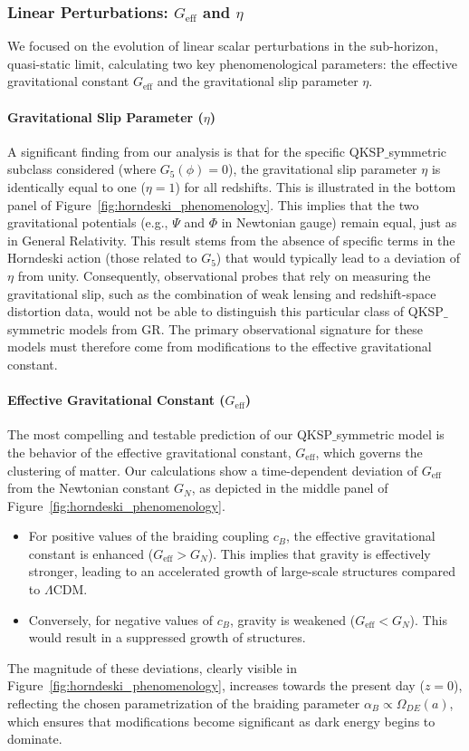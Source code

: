 \documentclass[twocolumn]{aastex631}
\begin{document}
\subsubsection{Linear Perturbations: $G_{\text{eff}}$ and $\eta$}
We focused on the evolution of linear scalar perturbations in the sub-horizon, quasi-static limit, calculating two key phenomenological parameters: the effective gravitational constant $G_{\text{eff}}$ and the gravitational slip parameter $\eta$.

\paragraph{Gravitational Slip Parameter ($\eta$)}
A significant finding from our analysis is that for the specific QKSP\ensuremath{\_}symmetric subclass considered (where $G_5(\phi)=0$), the gravitational slip parameter $\eta$ is identically equal to one ($\eta=1$) for all redshifts. This is illustrated in the bottom panel of \mbox{Figure \ref{fig:horndeski_phenomenology}}. This implies that the two gravitational potentials (e.g., $\Psi$ and $\Phi$ in Newtonian gauge) remain equal, just as in General Relativity. This result stems from the absence of specific terms in the Horndeski action (those related to $G_5$) that would typically lead to a deviation of $\eta$ from unity. Consequently, observational probes that rely on measuring the gravitational slip, such as the combination of weak lensing and redshift-space distortion data, would not be able to distinguish this particular class of QKSP\ensuremath{\_}symmetric models from GR. The primary observational signature for these models must therefore come from modifications to the effective gravitational constant.

\paragraph{Effective Gravitational Constant ($G_{\text{eff}}$)}
The most compelling and testable prediction of our QKSP\ensuremath{\_}symmetric model is the behavior of the effective gravitational constant, $G_{\text{eff}}$, which governs the clustering of matter. Our calculations show a time-dependent deviation of $G_{\text{eff}}$ from the Newtonian constant $G_N$, as depicted in the middle panel of \mbox{Figure \ref{fig:horndeski_phenomenology}}.
\begin{itemize}
    \item For positive values of the braiding coupling $c_B$, the effective gravitational constant is enhanced ($G_{\text{eff}} > G_N$). This implies that gravity is effectively stronger, leading to an accelerated growth of large-scale structures compared to $\Lambda$CDM.
    \item Conversely, for negative values of $c_B$, gravity is weakened ($G_{\text{eff}} < G_N$). This would result in a suppressed growth of structures.
\end{itemize}
The magnitude of these deviations, clearly visible in \mbox{Figure \ref{fig:horndeski_phenomenology}}, increases towards the present day ($z=0$), reflecting the chosen parametrization of the braiding parameter $\alpha_B \propto \Omega_{DE}(a)$, which ensures that modifications become significant as dark energy begins to dominate.
\end{document}
